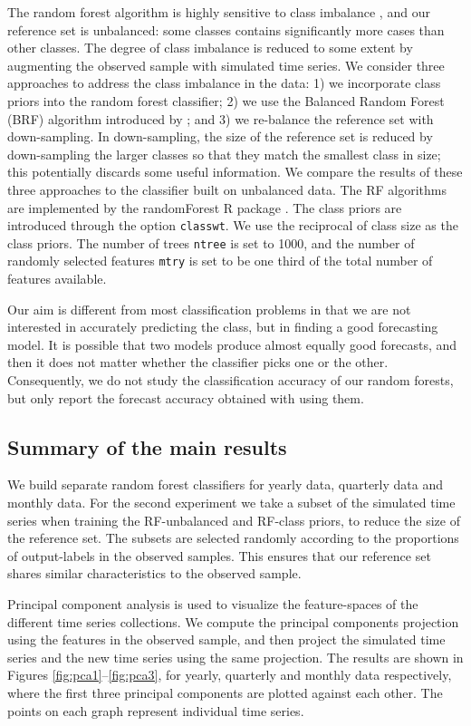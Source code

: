 \documentclass[11pt,a4paper,]{article}
\theoremstyle{definition}
\theoremstyle{definition}
\theoremstyle{definition}
\theoremstyle{remark}
\begin{document}
The random forest algorithm is highly sensitive to class imbalance
\autocite{breiman2001random}, and our reference set is unbalanced: some
classes contains significantly more cases than other classes. The degree
of class imbalance is reduced to some extent by augmenting the observed
sample with simulated time series. We consider three approaches to
address the class imbalance in the data: 1) we incorporate class priors
into the random forest classifier; 2) we use the Balanced Random Forest
(BRF) algorithm introduced by \textcite{chen2004using}; and 3) we
re-balance the reference set with down-sampling. In down-sampling, the
size of the reference set is reduced by down-sampling the larger classes
so that they match the smallest class in size; this potentially discards
some useful information. We compare the results of these three
approaches to the classifier built on unbalanced data. The RF algorithms
are implemented by the randomForest R package
\autocite{liaw2002randomforest}. The class priors are introduced through
the option \texttt{classwt}. We use the reciprocal of class size as the
class priors. The number of trees \texttt{ntree} is set to 1000, and the
number of randomly selected features \texttt{mtry} is set to be one
third of the total number of features available.

Our aim is different from most classification problems in that we are
not interested in accurately predicting the class, but in finding a good
forecasting model. It is possible that two models produce almost equally
good forecasts, and then it does not matter whether the classifier picks
one or the other. Consequently, we do not study the classification
accuracy of our random forests, but only report the forecast accuracy
obtained with using them.

\subsection{Summary of the main results}\label{sec:results}

We build separate random forest classifiers for yearly data, quarterly
data and monthly data. For the second experiment we take a subset of the
simulated time series when training the RF-unbalanced and RF-class
priors, to reduce the size of the reference set. The subsets are
selected randomly according to the proportions of output-labels in the
observed samples. This ensures that our reference set shares similar
characteristics to the observed sample.

Principal component analysis is used to visualize the feature-spaces of
the different time series collections. We compute the principal
components projection using the features in the observed sample, and
then project the simulated time series and the new time series using the
same projection. The results are shown in Figures
\ref{fig:pca1}--\ref{fig:pca3}, for yearly, quarterly and monthly data
respectively, where the first three principal components are plotted
against each other. The points on each graph represent individual time
series.
\end{document}
